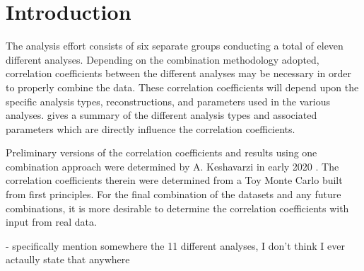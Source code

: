 
\graphicspath{{Body/Figures/}}

\clearpage
\section{Introduction}

The \Rone \wa analysis effort consists of six separate groups conducting a total of eleven different analyses. Depending on the combination methodology adopted, correlation coefficients between the different analyses may be necessary in order to properly combine the data. These correlation coefficients will depend upon the specific analysis types, reconstructions, and parameters used in the various analyses.  gives a summary of the different analysis types and associated parameters which are directly influence the correlation coefficients. 

Preliminary versions of the correlation coefficients and results using one combination approach were determined by A. Keshavarzi in early 2020 \cite{AlexCombinationNote}. The correlation coefficients therein were determined from a Toy Monte Carlo built from first principles. For the final combination of the \Rone datasets and any future combinations, it is more desirable to determine the correlation coefficients with input from real data. 



- specifically mention somewhere the 11 different analyses, I don't think I ever actaully state that anywhere



